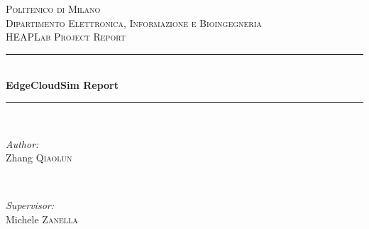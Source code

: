 \begin{titlepage}

\newcommand{\HRule}{\rule{\linewidth}{0.5mm}} %

\center %
 

\textsc{\LARGE Politenico di Milano}\\[1.5cm] %
\textsc{\Large Dipartimento Elettronica, Informazione e Bioingegneria}\\[0.5cm] %
\textsc{\large HEAPLab Project Report}\\[0.5cm] %


\HRule \\[0.4cm]
{ \huge \bfseries EdgeCloudSim Report}\\[0.4cm] %
\HRule \\[1.5cm]
 

\begin{minipage}{0.4\textwidth}
\begin{flushleft} \large
\emph{Author:}\\
Zhang \textsc{Qiaolun} %
\end{flushleft}
\end{minipage}
~
\begin{minipage}{0.4\textwidth}
\begin{flushright} \large
\emph{Supervisor:} \\
Michele \textsc{Zanella} %
\end{flushright}
\end{minipage}\\[2cm]



\end{titlepage}
